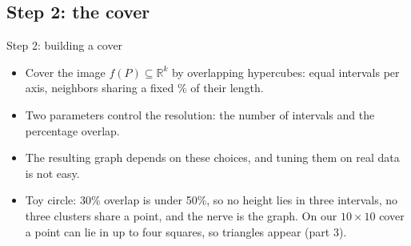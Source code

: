 \documentclass[aspectratio=169]{beamer}
\newcommand{\R}{\mathbb{R}}
\begin{document}
\subsection{Step 2: the cover}
\begin{frame}{Step 2: building a cover}
\begin{itemize}
  \item Cover the image $f(P) \subseteq \R^k$ by overlapping hypercubes: equal intervals per axis, neighbors sharing a fixed \% of their length. \hfill\parencite{singh2007mapper,madukpe2026review}
  \item Two parameters control the resolution: the \alert{number of intervals} and the \alert{percentage overlap}. \hfill\parencite{singh2007mapper}
  \item The resulting graph depends on these choices, and tuning them on real data is not easy. \hfill\parencite{carrieremicheloudot2018}
  \item Toy circle: 30\% overlap is under 50\%, so no height lies in three intervals, no three clusters share a point, and the nerve is the graph. On our $10 \times 10$ cover a point can lie in up to four squares, so triangles appear (part 3).
\end{itemize}
\vspace{6pt}
\centering
{}
\end{frame}
\end{document}
